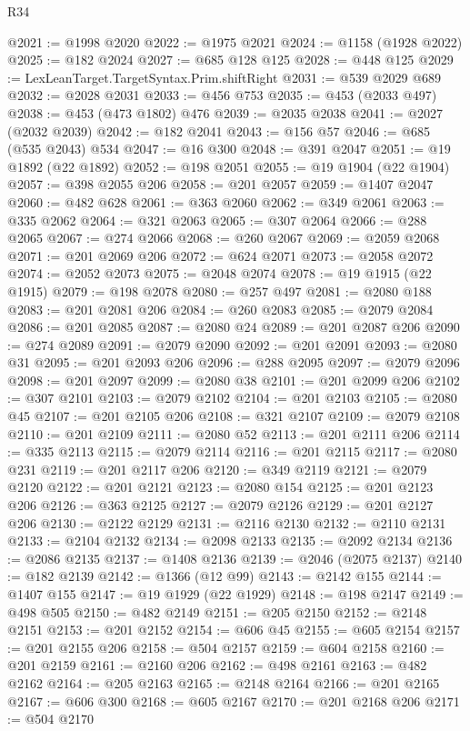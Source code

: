 \begin{lexlean}{R34}
\begin{coremodule}
@2021 := @1998 @2020
@2022 := @1975 @2021
@2024 := @1158 (@1928 @2022)
@2025 := @182 @2024
@2027 := @685 @128 @125
@2028 := @448 @125
@2029 := LexLeanTarget.TargetSyntax.Prim.shiftRight
@2031 := @539 @2029 @689
@2032 := @2028 @2031
@2033 := @456 @753
@2035 := @453 (@2033 @497)
@2038 := @453 (@473 @1802) @476
@2039 := @2035 @2038
@2041 := @2027 (@2032 @2039)
@2042 := @182 @2041
@2043 := @156 @57
@2046 := @685 (@535 @2043) @534
@2047 := @16 @300
@2048 := @391 @2047
@2051 := @19 @1892 (@22 @1892)
@2052 := @198 @2051
@2055 := @19 @1904 (@22 @1904)
@2057 := @398 @2055 @206
@2058 := @201 @2057
@2059 := @1407 @2047
@2060 := @482 @628
@2061 := @363 @2060
@2062 := @349 @2061
@2063 := @335 @2062
@2064 := @321 @2063
@2065 := @307 @2064
@2066 := @288 @2065
@2067 := @274 @2066
@2068 := @260 @2067
@2069 := @2059 @2068
@2071 := @201 @2069 @206
@2072 := @624 @2071
@2073 := @2058 @2072
@2074 := @2052 @2073
@2075 := @2048 @2074
@2078 := @19 @1915 (@22 @1915)
@2079 := @198 @2078
@2080 := @257 @497
@2081 := @2080 @188
@2083 := @201 @2081 @206
@2084 := @260 @2083
@2085 := @2079 @2084
@2086 := @201 @2085
@2087 := @2080 @24
@2089 := @201 @2087 @206
@2090 := @274 @2089
@2091 := @2079 @2090
@2092 := @201 @2091
@2093 := @2080 @31
@2095 := @201 @2093 @206
@2096 := @288 @2095
@2097 := @2079 @2096
@2098 := @201 @2097
@2099 := @2080 @38
@2101 := @201 @2099 @206
@2102 := @307 @2101
@2103 := @2079 @2102
@2104 := @201 @2103
@2105 := @2080 @45
@2107 := @201 @2105 @206
@2108 := @321 @2107
@2109 := @2079 @2108
@2110 := @201 @2109
@2111 := @2080 @52
@2113 := @201 @2111 @206
@2114 := @335 @2113
@2115 := @2079 @2114
@2116 := @201 @2115
@2117 := @2080 @231
@2119 := @201 @2117 @206
@2120 := @349 @2119
@2121 := @2079 @2120
@2122 := @201 @2121
@2123 := @2080 @154
@2125 := @201 @2123 @206
@2126 := @363 @2125
@2127 := @2079 @2126
@2129 := @201 @2127 @206
@2130 := @2122 @2129
@2131 := @2116 @2130
@2132 := @2110 @2131
@2133 := @2104 @2132
@2134 := @2098 @2133
@2135 := @2092 @2134
@2136 := @2086 @2135
@2137 := @1408 @2136
@2139 := @2046 (@2075 @2137)
@2140 := @182 @2139
@2142 := @1366 (@12 @99)
@2143 := @2142 @155
@2144 := @1407 @155
@2147 := @19 @1929 (@22 @1929)
@2148 := @198 @2147
@2149 := @498 @505
@2150 := @482 @2149
@2151 := @205 @2150
@2152 := @2148 @2151
@2153 := @201 @2152
@2154 := @606 @45
@2155 := @605 @2154
@2157 := @201 @2155 @206
@2158 := @504 @2157
@2159 := @604 @2158
@2160 := @201 @2159
@2161 := @2160 @206
@2162 := @498 @2161
@2163 := @482 @2162
@2164 := @205 @2163
@2165 := @2148 @2164
@2166 := @201 @2165
@2167 := @606 @300
@2168 := @605 @2167
@2170 := @201 @2168 @206
@2171 := @504 @2170

\end{coremodule}
\end{lexlean}
